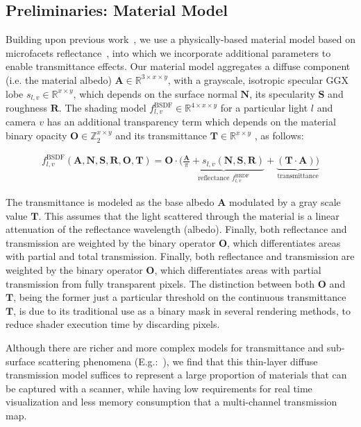 
\subsection{\textbf{Preliminaries: Material Model}}
Building upon previous work~\cite{rodriguezpardo2023UMat}, we use a physically-based material model based on microfacets reflectance~\cite{burley2012physically}, into which we incorporate additional parameters to enable transmittance effects. Our material model aggregates a diffuse component (i.e. the material albedo) $\mathbf{A} \in \mathbb{R}^{3 \times x  \times y}$, with a grayscale, isotropic specular GGX~\cite{walter2007microfacet} lobe $s_{l,v} \in \mathbb{R}^{x  \times y}$, which depends on the surface normal $\mathbf{N}$, its specularity $\mathbf{S}$ and roughness $\mathbf{R}$. The shading model $f_{l,v}^\textrm{BSDF} \in \mathbb{R}^{4 \times x  \times y}$ for a particular light $l$ and camera $v$ has an additional transparency term which depends on the material binary opacity $\mathbf{O} \in \mathbb{Z}_2^{x  \times y}$ and its transmittance  $\mathbf{T} \in \mathbb{R}^{x  \times y}$ , as follows: 

\begin{align}
	\label{eq:mat_model}
		f_{l,v}^\textrm{BSDF} (\mathbf{A},\mathbf{N},\mathbf{S},\mathbf{R},\mathbf{O},\mathbf{T})   = \mathbf{O}\cdot( \underbrace{\frac{\mathbf{A}}{\pi} + s_{l,v}(\mathbf{N},\mathbf{S},\mathbf{R})}_\text{reflectance $f_{l,v}^\textrm{BRDF}$}+ \underbrace{(\mathbf{T}\cdot\mathbf{A}))}_\text{transmittance}%
\end{align}


The transmittance is modeled as the base albedo $\mathbf{A}$ modulated by a  gray scale value $\mathbf{T}$. This assumes that the light scattered through the material is a linear attenuation of the reflectance wavelength (albedo). Finally, both reflectance and transmission are weighted by the binary operator $\mathbf{O}$, which differentiates areas with partial and total transmission.
Finally, both reflectance and transmission are weighted by the binary operator $\mathbf{O}$, which differentiates areas with partial transmission from fully transparent pixels. The distinction between both $\mathbf{O}$ and $\mathbf{T}$, being the former just a particular threshold on the continuous transmittance $\mathbf{T}$, is due to its traditional use as a binary mask in several rendering methods, to reduce shader execution time by discarding pixels.



Although there are richer and more complex models for transmittance and sub-surface scattering phenomena (E.g.:~\cite{burley2015extending}), we find that this thin-layer diffuse transmission model suffices to represent a large proportion of materials that can be captured with a scanner, while having low requirements for real time visualization and less memory consumption that a multi-channel transmission map. 

